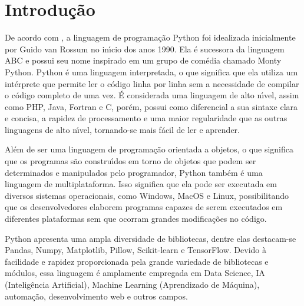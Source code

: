 
\chapter{Introdu\c{c}\~{a}o}

De acordo com \cite{Tulchak2016}, a linguagem de programa\c{c}\~{a}o Python foi idealizada inicialmente por Guido van Rossum no in\'{\i}cio dos anos 1990. Ela \'{e} sucessora da linguagem ABC e possui seu nome inspirado em um grupo de com\'{e}dia chamado Monty Python. Python \'{e} uma linguagem interpretada, o que significa que ela utiliza um int\'{e}rprete que permite ler o c\'{o}digo linha por linha sem a necessidade de compilar o c\'{o}digo completo de uma vez. \'{E} considerada uma linguagem de alto n\'{\i}vel, assim como PHP, Java, Fortran e C, por\'{e}m, possui como diferencial a sua sintaxe clara e concisa, a rapidez de processamento e uma maior regularidade que as outras linguagens de alto n\'{\i}vel, tornando-se mais f\'{a}cil de ler e aprender.

Al\'{e}m de ser uma linguagem de programa\c{c}\~{a}o orientada a objetos, o que significa que os programas s\~{a}o constru\'{\i}dos em torno de objetos que podem ser determinados e manipulados pelo programador, Python tamb\'{e}m \'{e} uma linguagem de multiplataforma. Isso significa que ela pode ser executada em diversos sistemas operacionais, como Windows, MacOS e Linux, possibilitando que os desenvolvedores elaborem programas capazes de serem executados em diferentes plataformas sem que ocorram grandes modifica\c{c}\~{o}es no c\'{o}digo.

Python apresenta uma ampla diversidade de bibliotecas, dentre elas destacam-se Pandas, Numpy, Matplotlib, Pillow, Scikit-learn e TensorFlow. Devido \`{a} facilidade e rapidez proporcionada pela grande variedade de bibliotecas e m\'{o}dulos, essa linguagem \'{e} amplamente empregada em Data Science, IA (Intelig\^{e}ncia Artificial), Machine Learning (Aprendizado de M\'{a}quina), automa\c{c}\~{a}o, desenvolvimento web e outros campos.


